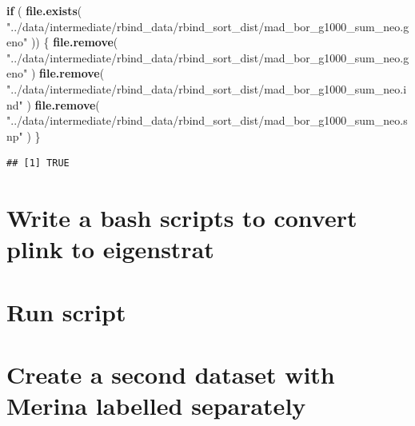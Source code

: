 \documentclass[
]{article}
\newenvironment{Shaded}{\begin{snugshade}}{\end{snugshade}}
\newcommand{\ControlFlowTok}[1]{\textcolor[rgb]{0.13,0.29,0.53}{\textbf{#1}}}
\newcommand{\FunctionTok}[1]{\textcolor[rgb]{0.13,0.29,0.53}{\textbf{#1}}}
\newcommand{\NormalTok}[1]{#1}
\newcommand{\StringTok}[1]{\textcolor[rgb]{0.31,0.60,0.02}{#1}}
\begin{document}
\begin{Shaded}
\begin{Highlighting}[]
\ControlFlowTok{if}\NormalTok{ (}
  \FunctionTok{file.exists}\NormalTok{(}
    \StringTok{"../data/intermediate/rbind\_data/rbind\_sort\_dist/mad\_bor\_g1000\_sum\_neo.geno"}
\NormalTok{  )) \{}
  \FunctionTok{file.remove}\NormalTok{(}
    \StringTok{"../data/intermediate/rbind\_data/rbind\_sort\_dist/mad\_bor\_g1000\_sum\_neo.geno"}
\NormalTok{  )}
  \FunctionTok{file.remove}\NormalTok{(}
    \StringTok{"../data/intermediate/rbind\_data/rbind\_sort\_dist/mad\_bor\_g1000\_sum\_neo.ind"}
\NormalTok{  )}
  \FunctionTok{file.remove}\NormalTok{(}
    \StringTok{"../data/intermediate/rbind\_data/rbind\_sort\_dist/mad\_bor\_g1000\_sum\_neo.snp"}
\NormalTok{  )}
\NormalTok{\}}
\end{Highlighting}
\end{Shaded}

\begin{verbatim}
## [1] TRUE
\end{verbatim}

\section{Write a bash scripts to convert plink to
eigenstrat}\label{write-a-bash-scripts-to-convert-plink-to-eigenstrat}

\section{Run script}\label{run-script}

\section{Create a second dataset with Merina labelled
separately}\label{create-a-second-dataset-with-merina-labelled-separately}
\end{document}
